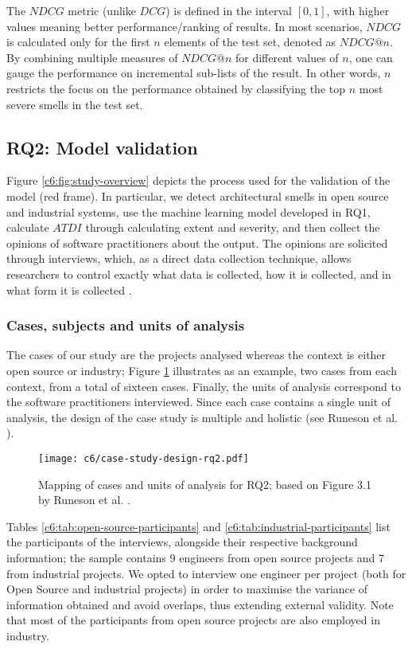 The $NDCG$ metric (unlike $DCG$) is defined in the interval $[0, 1]$, with higher values meaning better performance/ranking of results.
In most scenarios, $NDCG$ is calculated only for the first $n$ elements of the test set, denoted as $NDCG@n$.
By combining multiple measures of $NDCG@n$ for different values of $n$, one can gauge the performance on incremental sub-lists of the result.
In other words, $n$ restricts the focus on the performance obtained by classifying the top $n$ most severe smells in the test set.

\subsection{RQ2: Model validation}\label{c6:sec:rq2-methodology}
Figure \ref{c6:fig:study-overview} depicts the process used for the validation of the model (red frame).
In particular, we detect architectural smells in open source and industrial systems, use the machine learning model developed in RQ1, calculate $ATDI$ through calculating extent and severity, and then collect the opinions of software practitioners about the output. 
The opinions are solicited through interviews, which, as a direct data collection technique, allows researchers to control exactly what data is collected, how it is collected, and in what form it is collected \cite{Runeson2012,Lethbridge2005}. 

\subsubsection{Cases, subjects and units of analysis}
The cases of our study are the projects analysed whereas the context is either open source or industry; Figure \ref{c6:fig:case-study-design-rq2} illustrates as an example, two cases from each context, from a total of sixteen cases. 
Finally, the units of analysis correspond to the software practitioners interviewed. Since each case contains a single unit of analysis, the design of the case study is multiple and holistic (see Runeson et al. \cite{Runeson2012}).

\begin{figure}
    \centering
    \texttt{[image: c6/case-study-design-rq2.pdf]}
    \caption{Mapping of cases and units of analysis for RQ2; based on Figure 3.1 by Runeson et al. \cite{Runeson2012}.}\label{c6:fig:case-study-design-rq2}
\end{figure}

Tables \ref{c6:tab:open-source-participants} and \ref{c6:tab:industrial-participants} list the participants of the interviews, alongside their respective background information; the sample contains 9 engineers from open source projects and 7 from industrial projects.
We opted to interview one engineer per project (both for Open Source and  industrial projects) in order to maximise the variance of information obtained and avoid overlaps, thus extending external validity.
Note that most of the participants from open source projects are also employed in industry.

